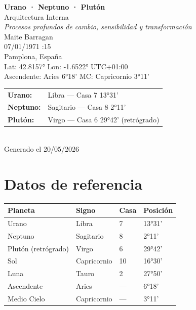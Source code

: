 \documentclass[11pt,a4paper]{article}
\begin{document}
\begin{titlepage}
  \centering
  \vspace*{1.5cm}
  {\Huge\bfseries\color{azulai} Urano · Neptuno · Plutón}\\[0.5cm]
  {\large\color{grisai} Arquitectura Interna}\\[0.3cm]
  {\small\itshape\color{grisai} Procesos profundos de cambio, sensibilidad y transformación}\\[2cm]
  {\huge\color{doradoai} Maite Barragan}\\[1.5cm]
  {\Large 07/01/1971 :15}\\[0.3cm]
  {\Large Pamplona, España}\\[0.3cm]
  {\normalsize Lat: 42.8157° \quad Lon: -1.6522° \quad UTC+01:00}\\[0.3cm]
  {\normalsize Ascendente: Aries 6°18' \quad
    MC: Capricornio 3°11'}\\[2cm]
  \begin{tabular}{ll}
    \textbf{Urano:}   & Libra — Casa 7 13°31'  \\
    \textbf{Neptuno:} & Sagitario — Casa 8 2°11' \\
    \textbf{Plutón:}  & Virgo — Casa 6 29°42' (retrógrado) \\
  \end{tabular}\\[2cm]
  \vfill
  {\small Generado el 20/05/2026}
\end{titlepage}

\tableofcontents
\newpage

\section{Datos de referencia}

\begin{center}
\begin{tabular}{llll}
  \toprule
  \textbf{Planeta} & \textbf{Signo} & \textbf{Casa} & \textbf{Posición} \\
  \midrule
  Urano    & Libra   & 7   & 13°31'  \\
  Neptuno & Sagitario  & 8  & 2°11' \\
  Plutón (retrógrado)  & Virgo  & 6  & 29°42' \\
  Sol              & Capricornio  & 10  & 16°30' \\
  Luna             & Tauro & 2 & 27°50' \\
  Ascendente       & Aries          & ---                   & 6°18' \\
  Medio Cielo      & Capricornio           & ---                   & 3°11' \\
  \bottomrule
\end{tabular}
\end{center}
\end{document}
